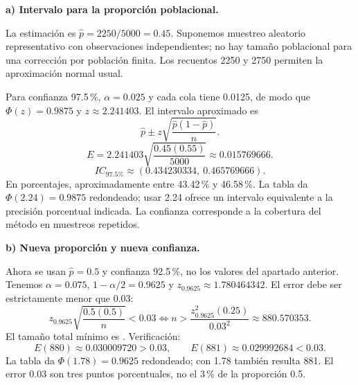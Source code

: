 \textbf{a) Intervalo para la proporción poblacional.}\par\nopagebreak[4]
La estimación es $\widehat p=2250/5000=0.45$. Suponemos muestreo aleatorio representativo con observaciones independientes; no hay tamaño poblacional para una corrección por población finita. Los recuentos 2250 y 2750 permiten la aproximación normal usual.

Para confianza 97.5\,\%, $\alpha=0.025$ y cada cola tiene 0.0125, de modo que $\Phi(z)=0.9875$ y $z\approx2.241403$. El intervalo aproximado es
\[
\widehat p\pm z\sqrt{\frac{\widehat p(1-\widehat p)}n}.
\]
\[
E=2.241403\sqrt{\frac{0.45(0.55)}{5000}}\approx0.015769666.
\]
\[
\boxed{IC_{\text{97.5\%}}\approx(0.434230334,\ 0.465769666).}
\]
En porcentajes, aproximadamente entre 43.42\,\% y 46.58\,\%. La tabla da $\Phi(2.24)=0.9875$ redondeado; usar 2.24 ofrece un intervalo equivalente a la precisión porcentual indicada. La confianza corresponde a la cobertura del método en muestreos repetidos.

\textbf{b) Nueva proporción y nueva confianza.}\par\nopagebreak[4]
Ahora se usan $\widehat p=0.5$ y confianza 92.5\,\%, no los valores del apartado anterior. Tenemos $\alpha=0.075$, $1-\alpha/2=0.9625$ y $z_{0.9625}\approx1.780464342$. El error debe ser estrictamente menor que 0.03:
\[
z_{0.9625}\sqrt{\frac{0.5(0.5)}n}<0.03
\iff n>\frac{z_{0.9625}^2(0.25)}{0.03^2}
\approx880.570353.
\]
El tamaño total mínimo es . Verificación:
\[
E(880)\approx0.030009720>0.03,\qquad
E(881)\approx0.029992684<0.03.
\]
La tabla da $\Phi(1.78)=0.9625$ redondeado; con 1.78 también resulta 881. El error 0.03 son tres puntos porcentuales, no el 3\,\% de la proporción 0.5.
